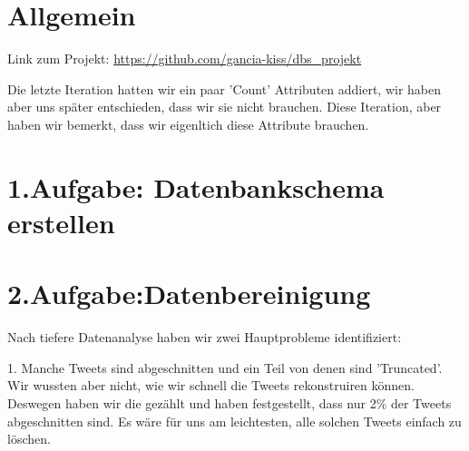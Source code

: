 \usepackage{graphicx}
\usepackage{listings} %

\newcommand{\dozent}{Prof.  Dr.  Agnès Voisard, Nicolas Lehmann}					%
\newcommand{\tutor}{Hoffman Christian}						%
\newcommand{\tutoriumNo}{ 3, Gruppe 22}				%
\newcommand{\projectNo}{2.Iteration}									%
\newcommand{\veranstaltung}{Datenbank Systeme}	%
\newcommand{\semester}{SoeSe 2017}						%
\newcommand{\studenten}{Ingrid Tchilibou, Emil Milanov, Boyan Hristov}			%






\section*{Allgemein}
Link zum Projekt: \url{https://github.com/gancia-kiss/dbs_projekt}

Die letzte Iteration hatten wir ein paar 'Count' Attributen addiert, wir haben aber uns später entschieden, dass wir sie nicht brauchen. Diese Iteration, aber haben wir bemerkt, dass wir eigenltich diese Attribute brauchen.

\section*{1.Aufgabe: Datenbankschema erstellen}



\section*{2.Aufgabe:Datenbereinigung}

Nach tiefere Datenanalyse haben wir zwei Hauptprobleme identifiziert:

1. Manche Tweets sind abgeschnitten und ein Teil von denen sind 'Truncated'. Wir wussten aber nicht, wie wir schnell die Tweets rekonstruiren können. Deswegen haben wir die gezählt und haben festgestellt, dass nur 2\% der Tweets abgeschnitten sind. Es wäre für uns am leichtesten, alle solchen Tweets einfach zu löschen.

